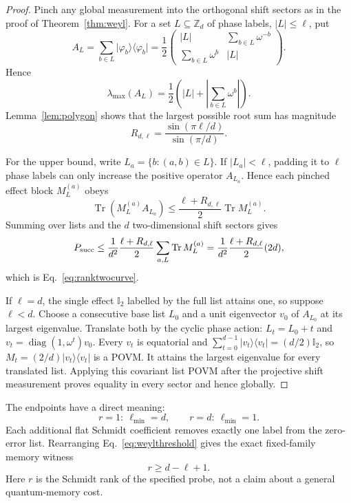 \documentclass[11pt,a4paper]{article}
\newcommand{\I}{\mathbb{I}}
\newcommand{\Tr}{\operatorname{Tr}}
\newcommand{\ket}[1]{\lvert #1\rangle}
\newcommand{\bra}[1]{\langle #1\rvert}
\newcommand{\proj}[1]{\ket{#1}\!\bra{#1}}
\begin{document}
\begin{proof}
Pinch any global measurement into the orthogonal shift sectors as in the
proof of Theorem~\ref{thm:weyl}.  For a set $L\subseteq\mathbb Z_d$ of phase
labels, $|L|\le\ell$, put
\[
 A_L=\sum_{b\in L}\proj{\varphi_b}
 =\frac12\begin{pmatrix}
 |L|&\sum_{b\in L}\omega^{-b}\\
 \sum_{b\in L}\omega^b&|L|
 \end{pmatrix}.
\]
Hence
\[
 \lambda_{\max}(A_L)
 =\frac12\left(|L|+\left|\sum_{b\in L}\omega^b\right|\right).
\]
Lemma~\ref{lem:polygon} shows that the largest possible root sum has magnitude
\begin{equation}\label{eq:rootsum}
 R_{d,\ell}=\frac{\sin(\pi\ell/d)}{\sin(\pi/d)}.
\end{equation}

For the upper bound, write
$L_a=\{b:(a,b)\in L\}$.  If $|L_a|<\ell$, padding it to $\ell$ phase labels
can only increase the positive operator $A_{L_a}$.  Hence each pinched effect
block $M_L^{(a)}$ obeys
\[
 \Tr\!\left(M_L^{(a)} A_{L_a}\right)
 \le \frac{\ell+R_{d,\ell}}{2}\Tr M_L^{(a)}.
\]
Summing over lists and the $d$ two-dimensional shift sectors gives
\[
 P_{\rm succ}
 \le \frac{1}{d^2}\frac{\ell+R_{d,\ell}}{2}
       \sum_{a,L}\Tr M_L^{(a)}
 =\frac{1}{d^2}\frac{\ell+R_{d,\ell}}{2}(2d),
\]
which is Eq.~\eqref{eq:ranktwocurve}.

If $\ell=d$, the single effect $\I_2$ labelled by the full list attains one,
so suppose $\ell<d$.  Choose a consecutive base list $L_0$ and a unit eigenvector
$v_0$ of $A_{L_0}$ at its largest eigenvalue.  Translate both by the cyclic
phase action: $L_t=L_0+t$ and
$v_t=\operatorname{diag}(1,\omega^t)v_0$.  Every $v_t$ is equatorial and
$\sum_{t=0}^{d-1}\proj{v_t}=(d/2)\I_2$, so
$M_t=(2/d)\proj{v_t}$ is a POVM.  It attains the largest eigenvalue for every
translated list.  Applying this covariant list POVM after the projective
shift measurement proves equality in every sector and hence globally.
\end{proof}

The endpoints have a direct meaning:
\[
 r=1:\ \ell_{\min}=d,
 \qquad
 r=d:\ \ell_{\min}=1.
\]
Each additional flat Schmidt coefficient removes exactly one label from the
zero-error list.  Rearranging Eq.~\eqref{eq:weylthreshold} gives the exact
fixed-family memory witness
\[
 r\ge d-\ell+1.
\]
Here $r$ is the Schmidt rank of the specified probe, not a claim about a
general quantum-memory cost.
\end{document}
